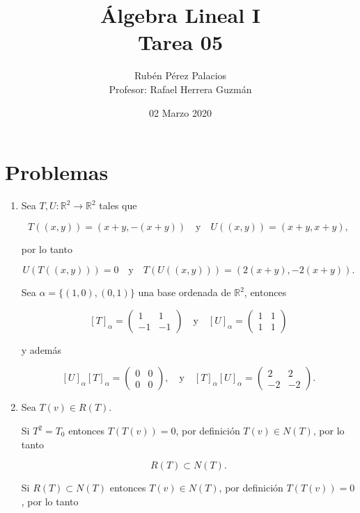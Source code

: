 \documentclass[letterpaper]{article}
\title{Álgebra Lineal I\\Tarea 05}
\author{Rubén Pérez Palacios\\Profesor: Rafael Herrera Guzmán}
\date{02 Marzo 2020}
\theoremstyle{definition}
\theoremstyle{lemathm}
\theoremstyle{lemademthm}
\newcommand{\Txty}{\quad\text{y}\quad}
\newcommand{\R}{\mathbb{R}}
\begin{document}
	\maketitle
    
    \section*{Problemas}

    \begin{enumerate}
        
        \item Sea $T,U: \R^2 \rightarrow \R^2$ tales que
        
        \[T((x,y)) = (x+y,-(x+y)) \Txty U((x,y)) = (x + y,x + y),\] 
        
        por lo tanto
        
        \[U(T((x,y))) = 0 \Txty T(U((x,y))) = (2(x + y), -2(x + y)).\]

        Sea $\alpha = \{(1,0),(0,1)\}$ una base ordenada de $\R^2$, entonces

        \[[T]_\alpha = \begin{pmatrix}
            1 & 1\\
            -1 & -1
        \end{pmatrix} \Txty [U]_\alpha = \begin{pmatrix}
            1 & 1\\
            1 & 1
        \end{pmatrix}\]

        y además

        \[[U]_\alpha [T]_\alpha = \begin{pmatrix}
            0 & 0\\
            0 & 0
        \end{pmatrix}, \Txty [T]_\alpha [U]_\alpha = \begin{pmatrix}
            2 & 2\\
            -2 & -2
        \end{pmatrix}.\]

        \item Sea $T(v) \in R(T)$.
        
        Si $T^2 = T_0$ entonces $T(T(v)) = 0$, por definición $T(v) \in N(T)$, por lo tanto 
        
        \[R(T) \subset N(T).\]

        Si $R(T) \subset N(T)$ entonces $T(v) \in N(T)$, por definición $T(T(v)) = 0$, por lo tanto
        

\end{enumerate}
\end{document}
